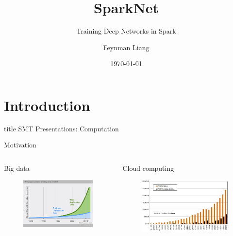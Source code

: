 \documentclass[pdf]{beamer}
\title[SparkNet]{SparkNet}
\subtitle{Training Deep Networks in Spark \cite{moritz2015sparknet}}
\author{Feynman Liang}
\institute{CUED}
\date{\today}
\begin{document}
\section{Introduction}

\begin{frame}
    \vfill
    \centering
    \begin{beamercolorbox}[sep=8pt,center,shadow=true,rounded=true]{title}
        SMT Presentations: Computation\par%
    \end{beamercolorbox}
    \vfill
\end{frame}

\begin{frame}[t]{Motivation}
    \begin{columns}
        \begin{column}{0.49\textwidth}
            \begin{block}{Big data}
                \begin{figure}[htpb]
                    \centering
                    \includegraphics[width=\linewidth]{Figures/growing-data.png}
                \end{figure}
            \end{block}
        \end{column}
        \begin{column}{0.49\textwidth}
            \begin{block}{Cloud computing}
                \begin{figure}[htpb]
                    \centering
                    \includegraphics[width=\linewidth]{Figures/growing-cloud.jpg}

\end{figure}
\end{block}
\end{column}
\end{columns}
\end{frame}
\end{document}
